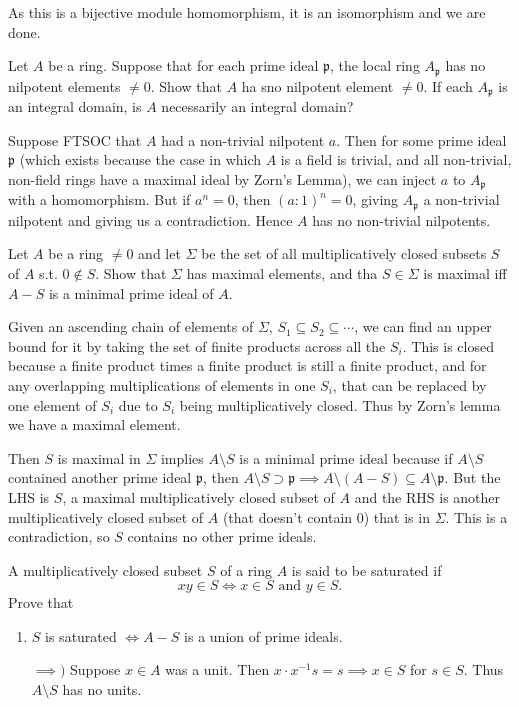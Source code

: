 \documentclass[a4paper]{exam}
\begin{document}
\begin{questions}
\begin{solution}
	As this is a bijective module homomorphism, it is an isomorphism and we are done.
\end{solution}

\question Let $A $ be a ring. Suppose that for each prime ideal $\mathfrak{p} $, the local ring $A_{\mathfrak{p}} $ has no nilpotent elements $\ne 0 $. Show that $A $ ha sno nilpotent element $\ne 0 $. If each $A_{\mathfrak{p}} $ is an integral domain, is $A $ necessarily an integral domain?
\begin{solution}
	Suppose FTSOC that $A $ had a non-trivial nilpotent $a $.
	Then for some prime ideal $\mathfrak{p} $ (which exists because the case in which $A $ is a field is trivial, and all non-trivial, non-field rings have a maximal ideal by Zorn's Lemma), we can inject $a $ to $A_{\mathfrak{p}} $ with a homomorphism.
	But if $a^n = 0 $, then $(a:1)^n = 0 $, giving $A_{\mathfrak{p}} $ a non-trivial nilpotent and giving us a contradiction.
	Hence $A $ has no non-trivial nilpotents.
\end{solution}

\question Let $A $ be a ring $\ne 0 $ and let $\Sigma  $ be the set of all multiplicatively closed subsets $S $ of $A $ s.t. $0\not\in S $. Show that $\Sigma  $ has maximal elements, and tha $S \in \Sigma $ is maximal iff $A - S $ is a minimal prime ideal of $A $.
\begin{solution}
	Given an ascending chain of elements of $\Sigma $, $S_{1}\subseteq S_{2} \subseteq \cdots $, we can find an upper bound for it by taking the set of finite products across all the $S_i $.
	This is closed because a finite product times a finite product is still a finite product, and for any overlapping multiplications of elements in one $S_i $, that can be replaced by one element of $S_i $ due to $S_i $ being multiplicatively closed.
	Thus by Zorn's lemma we have a maximal element.

	Then $S $ is maximal in $\Sigma $ implies $A \setminus S $ is a minimal prime ideal because if $A \setminus S  $ contained another prime ideal $\mathfrak{p} $, then $A\setminus S \supset \mathfrak{p} \implies A \setminus (A-S) \subseteq A \setminus \mathfrak{p} $.
	But the LHS is $S $, a maximal multiplicatively closed subset of $A $ and the RHS is another multiplicatively closed subset of $A $ (that doesn't contain $0 $) that is in $\Sigma $.
	This is a contradiction, so $S $ contains no other prime ideals.
\end{solution}

\question A multiplicatively closed subset $S $ of a ring $A $ is said to be saturated if
\[
	xy \in S \iff x \in S \text{ and } y \in S
.\] 
Prove that
\begin{enumerate}
	\item $S $ is saturated $\iff A - S $ is a union of prime ideals.
	\begin{solution}
		$\implies) $ Suppose $x\in A$ was a unit.
		Then $x \cdot x^{-1}s = s \implies x \in S$ for $s\in S $.
		Thus $A\setminus S $ has no units.


\end{solution}
\end{enumerate}
\end{questions}
\end{document}
